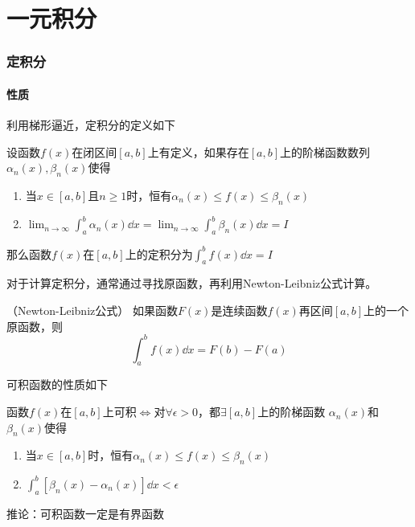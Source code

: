 \part{一元积分}

\section{定积分}
\subsection{性质}
利用梯形逼近，定积分的定义如下
\begin{definition}
    设函数$f(x)$在闭区间$[a,b]$上有定义，如果存在$[a,b]$上的阶梯函数数列$\alpha_n(x),\beta_n(x)$使得
    \begin{enumerate}[(1)]
        \item 当$x\in[a,b]$且$n\geq 1$时，恒有$\alpha_n(x)\leq f(x)\leq \beta_n(x)$
        \item $\lim_{n\to\infty} \int_a^b \alpha_n(x)\dd{x} = \lim_{n\to\infty}\int_a^b \beta_n(x)\dd{x} = I$
    \end{enumerate}
    那么函数$f(x)$在$[a,b]$上的定积分为$\int_a^b f(x)\dd{x} = I$
\end{definition}

对于计算定积分，通常通过寻找原函数，再利用Newton-Leibniz公式计算。
\begin{theorem}
    （Newton-Leibniz公式）
    \label{th:Newton-Leibniz公式}
    如果函数$F(x)$是连续函数$f(x)$再区间$[a,b]$上的一个原函数，则
    \[ \int_a^bf(x)\dd{x} = F(b)-F(a) \]
\end{theorem}

可积函数的性质如下
\begin{theorem}
    函数$f(x)$在$[a,b]$上可积$\iff$对$\forall \epsilon > 0$，都$\exists [a,b]$上的阶梯函数
    $\alpha_n(x)$和$\beta_n(x)$使得
    \begin{enumerate}[(1)]
        \item 当$x\in[a,b]$时，恒有$\alpha_n(x)\leq f(x)\leq \beta_n(x)$
        \item $\int_a^b [\beta_n(x)-\alpha_n(x)] \dd{x} < \epsilon$
    \end{enumerate}
    推论：可积函数一定是有界函数
\end{theorem}

